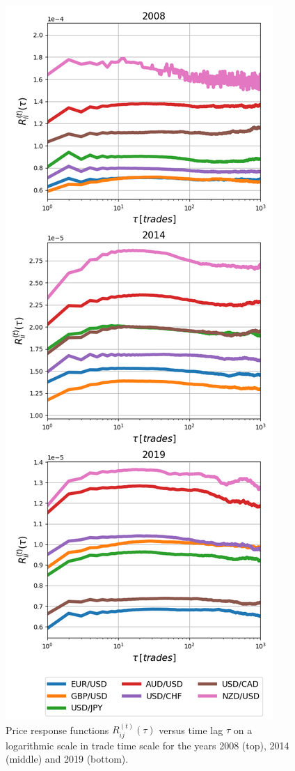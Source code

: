 \begin{figure}[htbp]
    \centering
    \includegraphics[width=\columnwidth]
    {figures/04_responses_trade_scale.png}
    \caption{Price response functions
             $R^{\left(t\right)}_{ij}\left(\tau\right)$ versus time lag $\tau$
             on a logarithmic scale in trade time scale for the years 2008
             (top), 2014 (middle) and 2019 (bottom).}
    \label{fig:response_function_trade_scale}
\end{figure}

